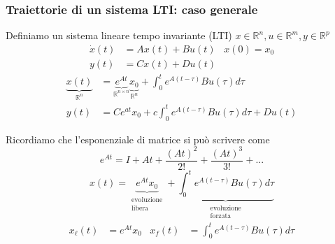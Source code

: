 \documentclass{article}
\begin{document}
\subsubsection{Traiettorie di un sistema LTI: caso generale}
Definiamo un sistema lineare tempo invariante (LTI) $x\in \mathbb{R}^n, u\in \mathbb{R}^m, y\in \mathbb{R}^p$
\begin{align*}
    \dot x(t) &= Ax(t) + Bu(t) &x(0) = x_0\\
    y(t) &= Cx(t) + Du(t)
\end{align*}
\begin{align*}
    \underbrace{x(t)}_{\mathbb{R}^n} &= \underbrace{e^{At}}_{\mathbb{R}^{n \times n}} \underbrace{x_0}_{\mathbb{R}^n} + \int_0^t e^{A(t-\tau)}Bu(\tau) d \tau \\
    y(t) &= Ce^{at}x_0 + c \int_0^t e^{A(t-\tau)}Bu(\tau) d \tau + Du(t)
\end{align*}

Ricordiamo che l'esponenziale di matrice si può scrivere come
\[
    e^{At} = I + At + \frac{(At)^2}{2!} + \frac{(At)^3}{3!} + ...
\]
\[
    x(t) = \underbrace{e^{At} x_0}_{\substack{\text{evoluzione} \\ \text{libera}}} + \underbrace{\int_0^t e^{A(t-\tau)}Bu(\tau) d \tau}_{\substack{\text{evoluzione} \\ \text{forzata}}}
\]
\begin{align*}
    x_\ell(t) &= e^{At}x_0 & x_f(t) &= \int_0^t e^{A(t-\tau)}Bu(\tau) d \tau
\end{align*}
\end{document}
